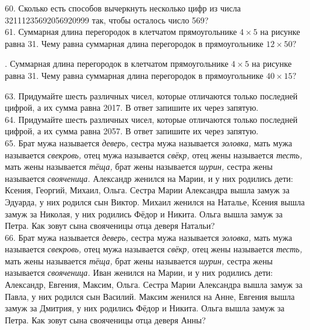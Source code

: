 60. Сколько есть способов вычеркнуть несколько цифр из числа 32111235692056920999 так, чтобы осталось число 569?\\
61. Суммарная длина перегородок в клетчатом прямоугольнике $4\times5$ на рисунке равна 31. Чему равна суммарная длина перегородок в прямоугольнике $12\times50?$
\begin{center}
\begin{figure}[ht!]
\end{figure}
\end{center}
\newpage
{}. Суммарная длина перегородок в клетчатом прямоугольнике $4\times5$ на рисунке равна 31. Чему равна суммарная длина перегородок в прямоугольнике $40\times15?$
\begin{center}
\begin{figure}[ht!]
\end{figure}
\end{center}
63. Придумайте шесть различных чисел, которые отличаются только последней цифрой, а их сумма равна 2017. В ответ запишите их через запятую.\\
64. Придумайте шесть различных чисел, которые отличаются только последней цифрой, а их сумма равна 2057. В ответ запишите их через запятую.\\
65. Брат мужа называется {\it деверь,} сестра мужа называется {\it золовка,} мать мужа называется {\it свекровь,} отец мужа называется {\it свёкр,} отец жены называется {\it тесть,} мать жены называется {\it тёща,} брат жены называется {\it шурин,} сестра жены называется {\it свояченица.} Александр женился на Марии, и у них родились дети: Ксения, Георгий, Михаил, Ольга. Сестра Марии Александра вышла замуж за Эдуарда, у них родился сын Виктор. Михаил женился на Наталье, Ксения вышла замуж за Николая, у них родились Фёдор и Никита. Ольга вышла замуж за Петра. Как зовут сына свояченицы отца деверя Натальи?\\
66.  Брат мужа называется {\it деверь,} сестра мужа называется {\it золовка,} мать мужа называется {\it свекровь,} отец мужа называется {\it свёкр,} отец жены называется {\it тесть,} мать жены называется {\it тёща,} брат жены называется {\it шурин,} сестра жены называется {\it свояченица.} Иван женился на Марии, и у них родились дети: Александр, Евгения, Максим, Ольга. Сестра Марии Александра вышла замуж за Павла, у них родился сын Василий. Максим женился на Анне, Евгения вышла замуж за Дмитрия, у них родились Фёдор и Никита. Ольга вышла замуж за Петра. Как зовут сына свояченицы отца деверя Анны?\\
